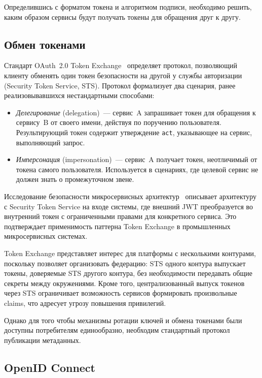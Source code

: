 Определившись с форматом токена и алгоритмом подписи,
необходимо решить, каким образом сервисы будут получать токены
для обращения друг к другу.

\subsection{Обмен токенами}\label{subsec:token-exchange}

Стандарт OAuth~2.0 Token Exchange~\cite{RFC8693} определяет протокол,
позволяющий клиенту обменять один токен безопасности на другой
у службы авторизации (Security Token Service, STS).
Протокол формализует два сценария,
ранее реализовывавшихся нестандартными способами:

\begin{itemize}
  \item \emph{Делегирование} (delegation)~---
    сервис~A запрашивает токен для обращения к сервису~B от своего имени,
    действуя по поручению пользователя.
    Результирующий токен содержит утверждение \texttt{act},
    указывающее на сервис, выполняющий запрос.
  \item \emph{Имперсонация} (impersonation)~---
    сервис~A получает токен, неотличимый от токена самого пользователя.
    Используется в сценариях,
    где целевой сервис не должен знать о промежуточном звене.
\end{itemize}

Исследование безопасности микросервисных архитектур~\cite{Matias2023}
описывает архитектуру
с Security Token Service на входе системы,
где внешний JWT преобразуется во внутренний токен
с ограниченными правами для конкретного сервиса.
Это подтверждает применимость паттерна Token Exchange
в промышленных микросервисных системах.

Token Exchange представляет интерес для платформы с несколькими контурами,
поскольку позволяет организовать федерацию:
STS одного контура выпускает токены, доверяемые STS другого контура,
без необходимости передавать общие секреты между окружениями.
Кроме того, централизованный выпуск токенов через STS
ограничивает возможность сервисов формировать произвольные claims,
что адресует угрозу повышения привилегий.

Однако для того чтобы механизмы ротации ключей и обмена токенами
были доступны потребителям единообразно,
необходим стандартный протокол публикации метаданных.

\subsection{OpenID Connect}\label{subsec:oidc}

